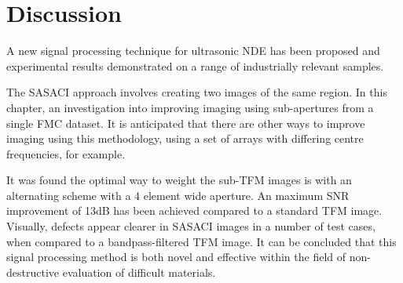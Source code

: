 \section{Discussion}
A new signal processing technique for ultrasonic NDE has been proposed and experimental results demonstrated on a range of industrially relevant samples.

The SASACI approach involves creating two images of the same region. In this chapter, an investigation into improving imaging using sub-apertures from a single FMC dataset. It is anticipated that there are other ways to improve imaging using this methodology, using a set of arrays with differing centre frequencies, for example.

It was found the optimal way to weight the sub-TFM images is with an alternating scheme with a 4 element wide aperture. An maximum SNR improvement of 13dB has been achieved compared to a standard TFM image. Visually, defects appear clearer in SASACI images in a number of test cases, when compared to a bandpass-filtered TFM image. It can be concluded that this signal processing method is both novel and effective within the field of non-destructive evaluation of difficult materials.





